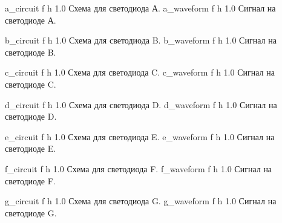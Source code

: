 \documentclass{bmstu}
\begin{document}
	{a_circuit}
	{f} %
	{h} %
	{1.0\textwidth} %
	{Схема для светодиода А.} %
	{a_waveform}
	{f} %
	{h} %
	{1.0\textwidth} %
	{Сигнал на светодиоде А.} %
	
	{b_circuit}
	{f} %
	{h} %
	{1.0\textwidth} %
	{Схема для светодиода B.} %
	{b_waveform}
	{f} %
	{h} %
	{1.0\textwidth} %
	{Сигнал на светодиоде B.} %
	
	{c_circuit}
	{f} %
	{h} %
	{1.0\textwidth} %
	{Схема для светодиода C.} %
	{c_waveform}
	{f} %
	{h} %
	{1.0\textwidth} %
	{Сигнал на светодиоде C.} %
	
	{d_circuit}
	{f} %
	{h} %
	{1.0\textwidth} %
	{Схема для светодиода D.} %
	{d_waveform}
	{f} %
	{h} %
	{1.0\textwidth} %
	{Сигнал на светодиоде D.} %
	
	{e_circuit}
	{f} %
	{h} %
	{1.0\textwidth} %
	{Схема для светодиода E.} %
	{e_waveform}
	{f} %
	{h} %
	{1.0\textwidth} %
	{Сигнал на светодиоде E.} %
	
	{f_circuit}
	{f} %
	{h} %
	{1.0\textwidth} %
	{Схема для светодиода F.} %
	{f_waveform}
	{f} %
	{h} %
	{1.0\textwidth} %
	{Сигнал на светодиоде F.} %
	
	{g_circuit}
	{f} %
	{h} %
	{1.0\textwidth} %
	{Схема для светодиода G.} %
	{g_waveform}
	{f} %
	{h} %
	{1.0\textwidth} %
	{Сигнал на светодиоде G.} %
	
\end{document}
